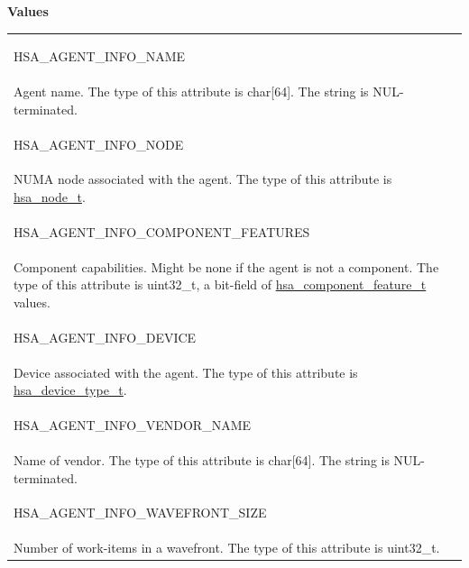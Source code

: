 \documentclass[final]{book}
\newcommand{\reftyp}[1]{#1}
\newcommand{\refenu}[1]{\reftyp{#1}}
\begin{document}
\noindent\textbf{Values}\\[-5mm]
\begin{longtable}{@{\hspace{2em}}p{\linewidth-2em}}
\hspace{-2em}\hypertarget{group__agentinfo_1gga39d0684207d95717d96319573b3e4a42a06b3ca6080e3bfd4d5b07db91d766e4c}{\refenu{HSA_\-AGENT_\-INFO_\-NAME}} \\Agent name. The type of this attribute is char[64]. The string is NUL-terminated.\\[2mm]
\hspace{-2em}\hypertarget{group__agentinfo_1gga39d0684207d95717d96319573b3e4a42a7e08d2bf6acfce669da4e810d3f7f28a}{\refenu{HSA_\-AGENT_\-INFO_\-NODE}} \\NUMA node associated with the agent. The type of this attribute is \hyperlink{group__agentinfo_1gaef5077ca9988ea43e37c17dea3884333}{hsa_\-node_\-t}.\\[2mm]
\hspace{-2em}\hypertarget{group__agentinfo_1gga39d0684207d95717d96319573b3e4a42aef97e9acddebff681cb31f7e6bf5bf9a}{\refenu{HSA_\-AGENT_\-INFO_\-COMPONENT_\-FEATURES}} \\Component capabilities. Might be none if the agent is not a component. The type of this attribute is uint32_\-t, a bit-field of \hyperlink{group__agentinfo_1gaad9e27e748546eb37f3a686858794d04}{hsa_\-component_\-feature_\-t} values.\\[2mm]
\hspace{-2em}\hypertarget{group__agentinfo_1gga39d0684207d95717d96319573b3e4a42a04660b9d69768cad7a7474310436ce88}{\refenu{HSA_\-AGENT_\-INFO_\-DEVICE}} \\Device associated with the agent. The type of this attribute is \hyperlink{group__agentinfo_1ga5e6c855643435ea1c2c7dc3fa2a123f0}{hsa_\-device_\-type_\-t}.\\[2mm]
\hspace{-2em}\hypertarget{group__agentinfo_1gga39d0684207d95717d96319573b3e4a42ac9e0c3d4f881d6de12ff8792eb92292c}{\refenu{HSA_\-AGENT_\-INFO_\-VENDOR_\-NAME}} \\Name of vendor. The type of this attribute is char[64]. The string is NUL-terminated.\\[2mm]
\hspace{-2em}\hypertarget{group__agentinfo_1gga39d0684207d95717d96319573b3e4a42a2474a5a57ecbf494156769f408ded8fd}{\refenu{HSA_\-AGENT_\-INFO_\-WAVEFRONT_\-SIZE}} \\Number of work-items in a wavefront. The type of this attribute is uint32_\-t.\\[2mm]

\end{longtable}
\end{document}
